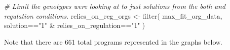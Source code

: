 \documentclass[
]{book}
\newenvironment{Shaded}{\begin{snugshade}}{\end{snugshade}}
\newcommand{\CommentTok}[1]{\textcolor[rgb]{0.56,0.35,0.01}{\textit{#1}}}
\newcommand{\FunctionTok}[1]{\textcolor[rgb]{0.00,0.00,0.00}{#1}}
\newcommand{\NormalTok}[1]{#1}
\newcommand{\OtherTok}[1]{\textcolor[rgb]{0.56,0.35,0.01}{#1}}
\newcommand{\SpecialCharTok}[1]{\textcolor[rgb]{0.00,0.00,0.00}{#1}}
\newcommand{\StringTok}[1]{\textcolor[rgb]{0.31,0.60,0.02}{#1}}
\begin{document}
\begin{Shaded}
\begin{Highlighting}[]
\CommentTok{\# Limit the genotypes we\textquotesingle{}re looking at to just solutions from the \textquotesingle{}both\textquotesingle{} and \textquotesingle{}regulation\textquotesingle{} conditions.}
\NormalTok{relies\_on\_reg\_orgs }\OtherTok{\textless{}{-}} \FunctionTok{filter}\NormalTok{(}
\NormalTok{  max\_fit\_org\_data,}
\NormalTok{  solution}\SpecialCharTok{==}\StringTok{"1"} \SpecialCharTok{\&}\NormalTok{ relies\_on\_regulation}\SpecialCharTok{==}\StringTok{"1"}
\NormalTok{)}
\end{Highlighting}
\end{Shaded}

Note that there are 661 total programs represented in the graphs below.
\end{document}
